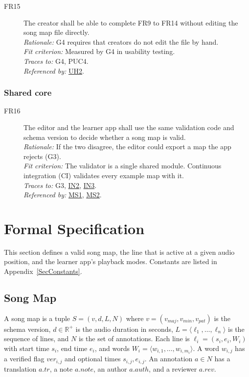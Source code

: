 \documentclass[12pt]{article}
\newcommand{\rat}[1]{\\\textit{Rationale:} #1}
\newcommand{\fit}[1]{\\\textit{Fit criterion:} #1}
\newcommand{\trace}[1]{\\\textit{Traces to:} #1}
\newcommand{\usedby}[1]{\\\textit{Referenced by:} #1}
\newcommand{\reqdef}[1]{\hypertarget{req:#1}{#1}}
\newcommand{\req}[1]{\hyperlink{req:#1}{#1}}
\begin{document}
\begin{description}
\item[\reqdef{FR15}] The creator shall be able to complete FR9 to FR14 without editing
the song map file directly.
\rat{G4 requires that creators do not edit the file by hand.}
\fit{Measured by G4 in usability testing.}
\trace{G4, PUC4.}
\usedby{\req{UH2}.}
\end{description}

\subsubsection*{Shared core}
\begin{description}
\item[\reqdef{FR16}] The editor and the learner app shall use the same validation code
and schema version to decide whether a song map is valid.
\rat{If the two disagree, the editor could export a map the app rejects (G3).}
\fit{The validator is a single shared module. Continuous integration (CI) validates every example map
with it.}
\trace{G3, \req{IN2}, \req{IN3}.}
\usedby{\req{MS1}, \req{MS2}.}
\end{description}

\section{Formal Specification} \label{SecFormal}

This section defines a valid song map, the line that is active at a given
audio position, and the learner app's playback modes. Constants are listed in
Appendix~\ref{SecConstants}.

\subsection{Song Map}
A song map is a tuple $S = (v, d, L, N)$ where $v = (v_{\mathit{maj}},
v_{\mathit{min}}, v_{\mathit{pat}})$ is the schema version, $d \in
\mathbb{R}^{+}$ is the audio duration in seconds, $L = \langle \ell_1, \ldots,
\ell_n \rangle$ is the sequence of lines, and $N$ is the set of annotations.
Each line is $\ell_i = (s_i, e_i, W_i)$ with start time $s_i$, end time $e_i$,
and words $W_i = \langle w_{i,1}, \ldots, w_{i,m_i} \rangle$. A word
$w_{i,j}$ has a verified flag $\mathit{ver}_{i,j}$ and optional times
$s_{i,j}, e_{i,j}$. An annotation $a \in N$ has a translation
$a.\mathit{tr}$, a note $a.\mathit{note}$, an author $a.\mathit{auth}$, and a
reviewer $a.\mathit{rev}$.
\end{document}
